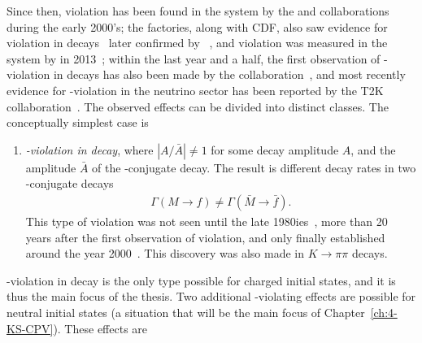 Since then, \CP violation has been found in the \Bz system by the \babar and \belle collaborations~\cite{boutignyObservationMathitCPViolation2001,bellecollaborationObservationLargeMathitCP2001} during the early 2000's; the \B factories, along with CDF, also saw evidence for \CP violation in \Bpm decays~\cite{abeStudyCPCP2006,bellecollaborationEvidenceSuppressedDecay2011,thebabarcollaborationMeasurementCPObservables2010,thebabarcollaborationSearchEnsuremathRightarrowu2010,cdfcollaborationMeasurementsBranchingFraction2010,cdfcollaborationMeasurementsBranchingFraction2011} later confirmed by \lhcb~\cite{LHCb-PAPER-2012-001}, and \CP violation was measured in the \Bs system by \lhcb in 2013~\cite{LHCb-PAPER-2013-018}; within the last year and a half, the first observation of \CP-violation in \Dz decays has also been made by the \lhcb collaboration~\cite{LHCb-PAPER-2019-006}, and most recently evidence for \CP-violation in the neutrino sector has been reported by the T2K collaboration~\cite{abeConstraintMatterAntimatter2020}. The observed effects can be divided into distinct classes. The conceptually simplest case is
\begin{enumerate}
    \item \emph{\CP-violation in decay}, where $|A / \bar A| \neq 1$ for some decay amplitude $A$, and the amplitude $\bar A$ of the \CP-conjugate decay. The result is different decay rates in two \CP-conjugate decays
    \begin{align}
        \Gamma (M\to f) \neq \Gamma (\bar M \to \bar f).
    \end{align}
    This type of \CP violation was not seen until the late 1980ies~\cite{gibbonsMeasurementCPviolationParameter1993,barrNewMeasurementDirect1993}, more than 20 years after the first observation of \CP violation, and only finally established around the year 2000~\cite{batleyPrecisionMeasurementDirect2002,ktevcollaborationMeasurementsDirectMathrmCP2003}. This discovery was also made in $K\to\pi\pi$ decays. 
\end{enumerate}
\CP-violation in decay is the only type possible for charged initial states, and it is thus the main focus of the thesis. Two additional \CP-violating effects are possible for neutral initial states (a situation that will be the main focus of Chapter~\ref{ch:4-KS-CPV}). These effects are
